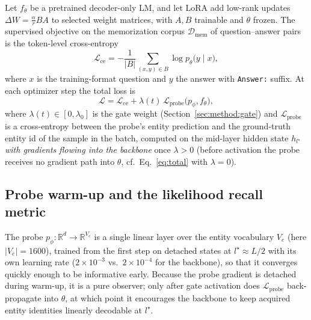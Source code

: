 Let $f_\theta$ be a pretrained decoder-only LM, and let LoRA
\citep{hu2022lora} add low-rank updates
$\Delta W = \tfrac{\alpha}{r} BA$ to selected weight matrices, with $A,B$
trainable and $\theta$ frozen. The supervised objective on the
memorization corpus $\mathcal{D}_{\mathrm{mem}}$ of question--answer
pairs is the token-level cross-entropy
\begin{equation}
  \mathcal{L}_{\mathrm{ce}}
  = -\frac{1}{|B|}\sum_{(x,y)\in B}
    \log p_\theta\!\bigl(y \mid x\bigr),
  \label{eq:ce}
\end{equation}
where $x$ is the training-format question and $y$ the answer with
\texttt{Answer:} suffix. At each optimizer step the total loss is
\begin{equation}
  \mathcal{L} = \mathcal{L}_{\mathrm{ce}}
  + \lambda(t)\, \mathcal{L}_{\mathrm{probe}}\bigl(p_\phi, f_\theta\bigr),
  \label{eq:total}
\end{equation}
where $\lambda(t)\!\in\![0,\lambda_0]$ is the gate weight
(Section~\ref{sec:method:gate}) and $\mathcal{L}_{\mathrm{probe}}$ is a
cross-entropy between the probe's entity prediction and the ground-truth
entity id of the sample in the batch, computed on the mid-layer hidden
state $h_{l^\star}$ \emph{with gradients flowing into the backbone} once
$\lambda>0$ (before activation the probe receives no gradient path into
$\theta$, cf.\ Eq.~\ref{eq:total} with $\lambda{=}0$).

\subsection{Probe warm-up and the likelihood recall metric}
\label{sec:method:probe}

The probe $p_\phi:\mathbb{R}^{d}\!\to\!\mathbb{R}^{V_e}$ is a single
linear layer over the entity vocabulary $V_e$ (here $|V_e|{=}1600$),
trained from the first step on detached states at
$l^\star{\approx}L/2$ with its own learning rate
($2{\times}10^{-3}$ vs.\ $2{\times}10^{-4}$ for the backbone), so that it
converges quickly enough to be informative early. Because the probe
gradient is detached during warm-up, it is a pure observer; only after
gate activation does $\mathcal{L}_{\mathrm{probe}}$ back-propagate into
$\theta$, at which point it encourages the backbone to keep acquired
entity identities linearly decodable at $l^\star$.

